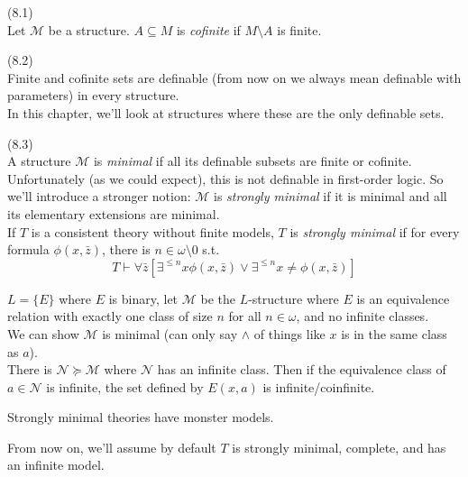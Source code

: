 \documentclass[a4paper]{article}
\begin{document}
\begin{defi} (8.1)\\
    Let $\mathcal{M}$ be a structure. $A\subseteq M$ is \emph{cofinite} if $M \setminus A$ is finite.
\end{defi}

\begin{rem} (8.2)\\
    Finite and cofinite sets are definable (from now on we always mean definable with parameters) in every structure.\\
    In this chapter, we'll look at structures where these are the only definable sets.
\end{rem}

\begin{defi} (8.3)\\
    A structure $\mathcal{M}$ is \emph{minimal} if all its definable subsets are finite or cofinite.\\
    Unfortunately (as we could expect), this is not definable in first-order logic. So we'll introduce a stronger notion: $\mathcal{M}$ is \emph{strongly minimal} if it is minimal and all its elementary extensions are minimal.\\
    If $T$ is a consistent theory without finite models, $T$ is \emph{strongly minimal} if for every formula $\phi(x,\bar{z})$, there is $n \in \omega \setminus 0$ s.t.
    $$T \vdash \forall \bar{z} [\exists^{\leq n} x \phi(x,\bar{z}) \vee \exists^{\leq n} x \neq \phi(x,\bar{z})]$$
\end{defi}

\begin{eg}
    $L=\{E\}$ where $E$ is binary, let $\mathcal{M}$ be the $L$-structure where $E$ is an equivalence relation with exactly one class of size $n$ for all $n \in \omega$, and no infinite classes.\\
    We can show $\mathcal{M}$ is minimal (can only say $\wedge$ of things like $x$ is in the same class as $a$).\\
    There is $\mathcal{N} \succcurlyeq \mathcal{M}$ where $\mathcal{N}$ has an infinite class. Then if the equivalence class of $a \in \mathcal{N}$ is infinite, the set defined by $E(x,a)$ is infinite/coinfinite.
\end{eg}

\begin{rem}
    Strongly minimal theories have monster models.
\end{rem}

From now on, we'll assume by default $T$ is strongly minimal, complete, and has an infinite model.
\end{document}
